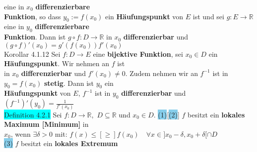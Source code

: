 \documentclass[10pt]{article}
\begin{document}
                eine in \textcolor{NavyBlue}{$x_0$}
                \textbf{differenzierbare \\
        \indent Funktion}, so dass \textcolor{NavyBlue}{$y_0:=f(x_0)$} ein \textbf{Häufungspunkt} von 
                \textcolor{NavyBlue}{$E$} ist und sei 
                \textcolor{NavyBlue}{$g:E\longrightarrow\mathbb{R}$} eine in 
                \textcolor{NavyBlue}{$y_0$} 
                \textbf{differenzierbare \\
        \indent Funktion}. Dann ist 
                \textcolor{NavyBlue}{$g\circ f:D\longrightarrow\mathbb{R}$} in 
                \textcolor{NavyBlue}{$x_0$} \textbf{differenzierbar} und 
                \textcolor{NavyBlue}{$(g\circ f)'(x_0)=g'(f(x_0))f'(x_0)$}\\
\colorbox{BurntOrange}{Korollar 4.1.12} Sei \textcolor{NavyBlue}{$f:D\longrightarrow E$} eine 
                \textbf{bijektive Funktion}, sei 
                \textcolor{NavyBlue}{$x_0\in D$} ein \textbf{Häufungspunkt}. 
                Wir nehmen an \textcolor{NavyBlue}{$f$} ist\\ 
        \indent in \textcolor{NavyBlue}{$x_0$} \textbf{differenzierbar} und 
                \textcolor{NavyBlue}{$f'(x_0)\neq0$}. Zudem nehmen 
                wir an \textcolor{NavyBlue}{$f^{-1}$} ist in \textcolor{NavyBlue}{$y_0=f(x_0)$}
                \textbf{stetig}. Dann ist \textcolor{NavyBlue}{$y_0$} ein \\
        \indent \textbf{Häufungspunkt} von \textcolor{NavyBlue}{$E$}, 
                \textcolor{NavyBlue}{$f^{-1}$} ist in \textcolor{NavyBlue}{$y_0$} 
                \textbf{differenzierbar} 
                und \textcolor{NavyBlue}{$(f^{-1})'(y_0)=\frac{1}{f'(x_0)}$}\\
\colorbox{cyan}{Definition 4.2.1} Sei 
                \textcolor{NavyBlue}{$f:D\longrightarrow\mathbb{R}$},\,
                \textcolor{NavyBlue}{$D\subseteq\mathbb{R}$}
                und \textcolor{NavyBlue}{$x_0\in D$}. 
                \colorbox{SkyBlue}{(1)}[\colorbox{SkyBlue}{(2)}] 
                \textcolor{NavyBlue}{$f$} besitzt ein \textbf{lokales Maximum [Minimum]} in \\
        \indent\indent \textcolor{NavyBlue}{$x_0$}, wenn 
                \textcolor{NavyBlue}{$\exists\delta>0$} mit: 
                \textcolor{NavyBlue}{$f(x)\leqslant[\geqslant] f(x_0)\quad
                \forall x\in]x_0-\delta,x_0+\delta[\cap D$} \\
        \indent \colorbox{SkyBlue}{(3)} $f$ besitzt ein \textbf{lokales Extremum} 
\end{document}
